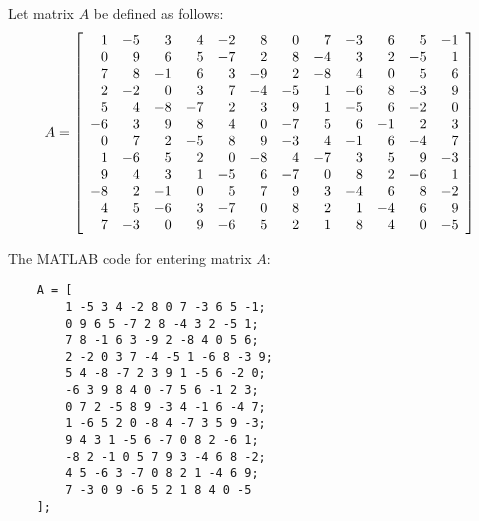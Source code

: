 \documentclass{ximera}
\author{Zack Reed}
\begin{document}
\begin{problem}
    
    Let matrix \( A \) be defined as follows:
    \[
    A = \startmat{rrrrrrrrrrrr}
        1 & -5 & 3 & 4 & -2 & 8 & 0 & 7 & -3 & 6 & 5 & -1 \\
        0 & 9 & 6 & 5 & -7 & 2 & 8 & -4 & 3 & 2 & -5 & 1 \\
        7 & 8 & -1 & 6 & 3 & -9 & 2 & -8 & 4 & 0 & 5 & 6 \\
        2 & -2 & 0 & 3 & 7 & -4 & -5 & 1 & -6 & 8 & -3 & 9 \\
        5 & 4 & -8 & -7 & 2 & 3 & 9 & 1 & -5 & 6 & -2 & 0 \\
        -6 & 3 & 9 & 8 & 4 & 0 & -7 & 5 & 6 & -1 & 2 & 3 \\
        0 & 7 & 2 & -5 & 8 & 9 & -3 & 4 & -1 & 6 & -4 & 7 \\
        1 & -6 & 5 & 2 & 0 & -8 & 4 & -7 & 3 & 5 & 9 & -3 \\
        9 & 4 & 3 & 1 & -5 & 6 & -7 & 0 & 8 & 2 & -6 & 1 \\
        -8 & 2 & -1 & 0 & 5 & 7 & 9 & 3 & -4 & 6 & 8 & -2 \\
        4 & 5 & -6 & 3 & -7 & 0 & 8 & 2 & 1 & -4 & 6 & 9 \\
        7 & -3 & 0 & 9 & -6 & 5 & 2 & 1 & 8 & 4 & 0 & -5
    \stopmat
    \]
    
    \begin{hint}
    The MATLAB code for entering matrix \( A \):
    \begin{verbatim}
    A = [
        1 -5 3 4 -2 8 0 7 -3 6 5 -1;
        0 9 6 5 -7 2 8 -4 3 2 -5 1;
        7 8 -1 6 3 -9 2 -8 4 0 5 6;
        2 -2 0 3 7 -4 -5 1 -6 8 -3 9;
        5 4 -8 -7 2 3 9 1 -5 6 -2 0;
        -6 3 9 8 4 0 -7 5 6 -1 2 3;
        0 7 2 -5 8 9 -3 4 -1 6 -4 7;
        1 -6 5 2 0 -8 4 -7 3 5 9 -3;
        9 4 3 1 -5 6 -7 0 8 2 -6 1;
        -8 2 -1 0 5 7 9 3 -4 6 8 -2;
        4 5 -6 3 -7 0 8 2 1 -4 6 9;
        7 -3 0 9 -6 5 2 1 8 4 0 -5
    ];
    \end{verbatim}

    \end{hint}
    

\end{problem}
\end{document}
